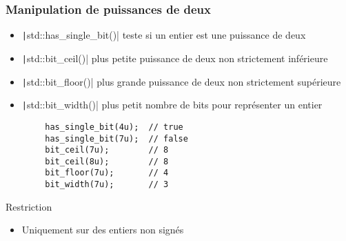 \documentclass[C++.tex]{subfiles}
\begin{document}
\begin{frame}[fragile]
	\frametitle{Manipulation de puissances de deux}
	\begin{itemize}
		\item \texttt|std::has_single_bit()| teste si un entier est une puissance de deux
		\item \texttt|std::bit_ceil()| plus petite puissance de deux non strictement inférieure
		\item \texttt|std::bit_floor()| plus grande puissance de deux non strictement supérieure
		\item \texttt|std::bit_width()| plus petit nombre de bits pour représenter un entier
	\end{itemize}

	\begin{verbatim}
		has_single_bit(4u);  // true
		has_single_bit(7u);  // false
		bit_ceil(7u);        // 8
		bit_ceil(8u);        // 8
		bit_floor(7u);       // 4
		bit_width(7u);       // 3
	\end{verbatim}

	\begin{alertblock}{Restriction}
		\begin{itemize}
			\item Uniquement sur des entiers non signés
		\end{itemize}
	\end{alertblock}


\end{frame}
\end{document}
